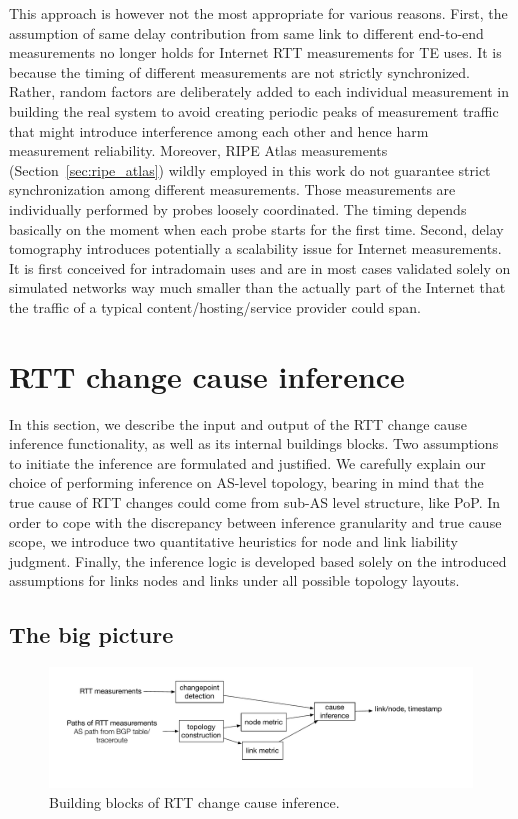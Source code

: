This approach is however not the most appropriate for various reasons. First, the assumption of
same delay contribution from same link to different end-to-end measurements no longer holds for Internet RTT measurements for TE uses. It is because the timing of different measurements are not strictly synchronized. Rather, random factors are deliberately added to each individual measurement in building the real system to avoid creating periodic peaks of measurement traffic that might introduce interference among each other and hence harm measurement reliability. Moreover,  RIPE Atlas measurements (Section~\ref{sec:ripe_atlas}) wildly employed in this work do not guarantee strict synchronization among different measurements.
Those measurements are individually performed by probes loosely coordinated. The timing depends basically on the moment when each probe starts for the first time.
Second, delay tomography introduces potentially a scalability issue for Internet measurements.
It is first conceived for intradomain uses and are in most cases validated solely on simulated networks way much smaller than the actually part of the Internet that the traffic of a typical content/hosting/service provider could span.

\section{RTT change cause inference}
\label{sec:inference}
In this section, we describe the input and output of the RTT change cause inference functionality, as well as its internal buildings blocks. 
Two assumptions to initiate the inference are formulated and justified.
We carefully explain our choice of performing inference on AS-level topology, bearing in mind that the true cause of RTT changes could come from sub-AS level structure, like \ac{PoP}.
In order to cope with the discrepancy between inference granularity and true cause scope, we introduce two quantitative heuristics for node and link liability judgment.
Finally, the inference logic is developed based solely on the introduced assumptions for links nodes and links under all possible topology layouts.

\subsection{The big picture}

\begin{figure}[!htb]
\centering
\includegraphics[width=1.2\textwidth]{gfx/chap5/sys_design.pdf}
\caption{Building blocks of RTT change cause inference.}
\label{fig:chap5_sys_design}
\end{figure}

